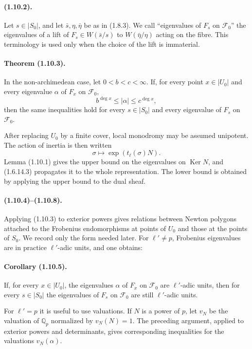 \documentclass[11pt]{article}
\theoremstyle{remark}
\newcommand{\QQ}{\mathbb{Q}}
\newcommand{\Ker}{\operatorname{Ker}}
\begin{document}
\paragraph{(1.10.2).}
Let \(s\in |S_0|\), and let \(\bar s,\eta,\bar\eta\) be as in (1.8.3). We call ``eigenvalues of \(F_s\) on \(\mathcal F_0\)'' the eigenvalues of a lift of \(F_s\in W(\bar s/s)\) to \(W(\bar\eta/\eta)\) acting on the fibre. This terminology is used only when the choice of the lift is immaterial.

\paragraph{Theorem (1.10.3).}
In the non-archimedean case, let \(0<b<c<\infty\). If, for every point \(x\in |U_0|\) and every eigenvalue \(\alpha\) of \(F_x\) on \(\mathcal F_0\),
\[
b^{\deg x}\le |\alpha|\le c^{\deg x},
\]
then the same inequalities hold for every \(s\in |S_0|\) and every eigenvalue of \(F_s\) on \(\mathcal F_0\).

After replacing \(U_0\) by a finite cover, local monodromy may be assumed unipotent. The action of inertia is then written
\[
\sigma\longmapsto \exp(t_\ell(\sigma)N).
\]
Lemma (1.10.1) gives the upper bound on the eigenvalues on \(\Ker N\), and (1.6.14.3) propagates it to the whole representation. The lower bound is obtained by applying the upper bound to the dual sheaf.

\paragraph{(1.10.4)--(1.10.8).}
Applying (1.10.3) to exterior powers gives relations between Newton polygons attached to the Frobenius endomorphisms at points of \(U_0\) and those at the points of \(S_0\). We record only the form needed later. For \(\ell'\ne p\), Frobenius eigenvalues are in practice \(\ell'\)-adic units, and one obtains:

\paragraph{Corollary (1.10.5).}
If, for every \(x\in |U_0|\), the eigenvalues \(\alpha\) of \(F_x\) on \(\mathcal F_0\) are \(\ell'\)-adic units, then for every \(s\in |S_0|\) the eigenvalues of \(F_s\) on \(\mathcal F_0\) are still \(\ell'\)-adic units.

For \(\ell'=p\) it is useful to use valuations. If \(N\) is a power of \(p\), let \(v_N\) be the valuation of \(\QQ_p\) normalized by \(v_N(N)=1\). The preceding argument, applied to exterior powers and determinants, gives corresponding inequalities for the valuations \(v_N(\alpha)\).
\end{document}
